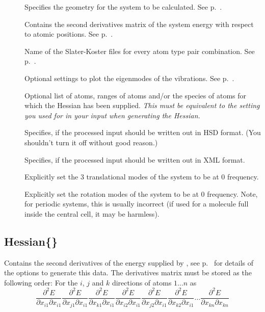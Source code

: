 \begin{description}
\item[] Specifies the geometry for the system to be
  calculated.  See p.~.
\item[] Contains the second derivatives matrix of the
  system energy with respect to atomic positions. See
  p.~.
\item[] Name of the Slater-Koster files for every atom
  type pair combination. See p.~.
\item[] Optional settings to plot the eigenmodes of the
  vibrations. See p.~.
\item[] Optional list of atoms, ranges of atoms and/or the species of
  atoms for which the Hessian has been supplied. \emph{This must be equivalent
    to the setting you used for  in your \dftbp{} input when
    generating the Hessian.}
\item[] Specifies, if the processed input should be written
  out in HSD format. (You shouldn't turn it off without good reason.)
\item[] Specifies, if the processed input should be written
  out in XML format.
\item[] Explicitly set the 3 translational modes of the
  system to be at 0 frequency.
\item[] Explicitly set the rotation modes of the system to be
  at 0 frequency. Note, for periodic systems, this is usually incorrect (if used
  for a molecule full inside the central cell, it may be harmless).
\end{description}


\subsection{Hessian\{\}}
\label{sec:modes.Hessian}

Contains the second derivatives of the energy supplied by
{\dftbp}, see p.~ for details of the options
to generate this data. The derivatives matrix must be stored as the following
order: For the $i$, $j$ and $k$ directions of atoms $1 \ldots n$
as $$\frac{\partial^2 E}{\partial x_{i1} \partial x_{i1}} \frac{\partial^2
  E}{\partial x_{j1} \partial x_{i1}} \frac{\partial^2 E}{\partial x_{k1}
  \partial x_{i1}} \frac{\partial^2 E}{\partial x_{i2} \partial x_{i1}}
\frac{\partial^2 E}{\partial x_{j2} \partial x_{i1}} \frac{\partial^2
  E}{\partial x_{k2} \partial x_{i1}} \ldots \frac{\partial^2 E}{\partial x_{kn}
  \partial x_{kn}}$$

